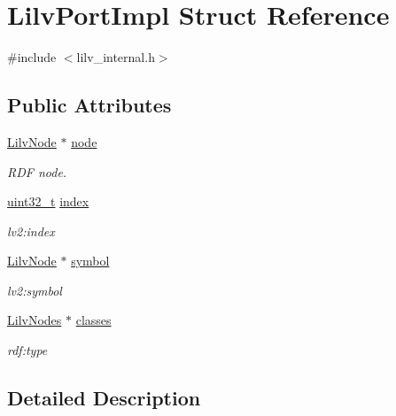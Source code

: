 \hypertarget{struct_lilv_port_impl}{}\section{Lilv\+Port\+Impl Struct Reference}
\label{struct_lilv_port_impl}


{\ttfamily \#include $<$lilv\+\_\+internal.\+h$>$}

\subsection*{Public Attributes}
\begin{DoxyCompactItemize}
\item 
\hyperlink{lilv_8h_ae183dca3dca5368d34dbd863a405437b}{Lilv\+Node} $\ast$ \hyperlink{struct_lilv_port_impl_a70e1a3f6bc29957faff7a2d1068c1a3b}{node}
\begin{DoxyCompactList}\small\item\em R\+DF node. \end{DoxyCompactList}\item 
\hyperlink{lib-src_2ffmpeg_2win32_2stdint_8h_a6eb1e68cc391dd753bc8ce896dbb8315}{uint32\+\_\+t} \hyperlink{struct_lilv_port_impl_ac9143be2e423888b95e416fbd388ab33}{index}
\begin{DoxyCompactList}\small\item\em lv2\+:index \end{DoxyCompactList}\item 
\hyperlink{lilv_8h_ae183dca3dca5368d34dbd863a405437b}{Lilv\+Node} $\ast$ \hyperlink{struct_lilv_port_impl_a5c5c752bd0daa332344f246dab05065c}{symbol}
\begin{DoxyCompactList}\small\item\em lv2\+:symbol \end{DoxyCompactList}\item 
\hyperlink{lilv_8h_a256c2c4443307f320de24bb31198df83}{Lilv\+Nodes} $\ast$ \hyperlink{struct_lilv_port_impl_a090b8ea7e0a258563472d7ed8fe6e193}{classes}
\begin{DoxyCompactList}\small\item\em rdf\+:type \end{DoxyCompactList}\end{DoxyCompactItemize}


\subsection{Detailed Description}


